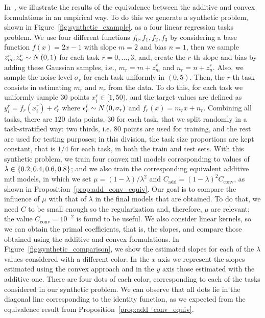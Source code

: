 In~\citet{RuizAD19}, we illustrate the results of the equivalence between the additive and convex formulations in an empirical way. To do this we generate a synthetic problem, shown in Figure~\ref{fig:synthetic_example}, as a four linear regression tasks problem. 
%
We use four different functions $f_0, f_1, f_2, f_3$ by considering a base function $f(x) = 2x - 1$ with slope $m=2$ and bias $n=1$, then we sample $z_m^r, z_n^r \sim N \left(0, 1\right)$ for each task $r=0, \ldots, 3$, and, create the $r$-th slope and bias by adding these Gaussian samples, i.e., $m_r = m + z_m^r$ and $n_r = n + z_n^r$. Also, we sample the noise level $\sigma_r$ for each task uniformly in $(0, 5)$. 
%
Then, the $r$-th task consists in estimating $m_r$ and $n_r$ from the data. To do this, for each task we uniformly sample $30$ points $x_i^r \in [1, 50)$, and the target values are defined as $y_i^r = f_r(x_i^r) + \epsilon^i_r$ where $\epsilon^i_r \sim N \left(0, \sigma_r\right)$ and $f_r(x) = m_r x + n_r$.
%
Combining all tasks, there are $120$ data points, $30$ for each task, that we split randomly in a task-stratified way: two thirds, i.e. $80$ points are used for training, and the rest are used for testing purposes; in this division, the task size proportions are kept constant, that is $1/4$ for each task, in both the train and test sets. 
%
With this synthetic problem, we train four convex \acrshort{mtl} models corresponding to values of $\lambda \in \left\{0.2, 0.4, 0.6, 0.8\right\}$; and we also train the corresponding equivalent additive \acrshort{mtl} models, in which we set $\mu = (1 - \lambda)/\lambda^2$ and $C_\text{add} = (1 - \lambda)^2 C_\text{conv}$, as shown in Proposition~\ref{prop:add_conv_equiv}.
%
Our goal is to compare the influence of $\mu$ with that of $\lambda$ in the final models that are obtained. To do that, we need $C$ to be small enough so the regularization and, therefore, $\mu$ are relevant; the value $C_{\text{conv}} = 10^{-2}$ is found to be useful. We also consider linear kernels, so we can obtain the primal coefficients, that is, the slopes, and compare those obtained using the additive and convex formulations. In Figure~\ref{fig:synthetic_comparison}, we show the estimated slopes for each of the $\lambda$ values considered with a different color. In the $x$ axis we represent the slopes estimated using the convex approach and in the $y$ axis those estimated with the additive one. There are four dots of each color, corresponding to each of the tasks considered in our synthetic problem. We can observe that all dots lie in the diagonal line corresponding to the identity function, as we expected from the equivalence result from Proposition~\ref{prop:add_conv_equiv}.

